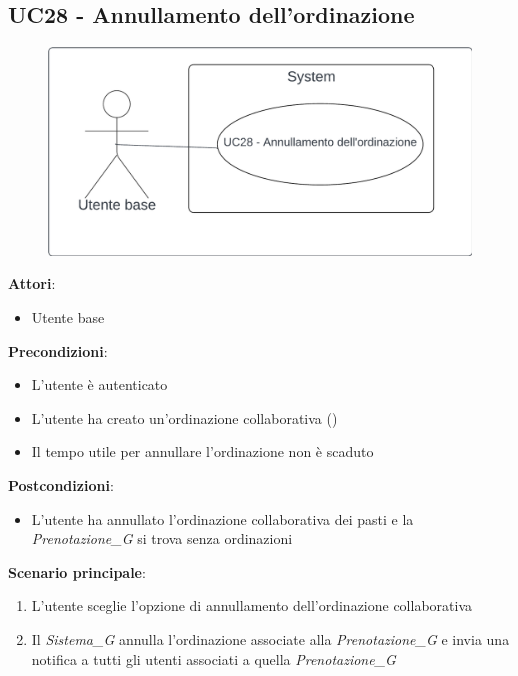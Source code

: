 \subsection{UC28 - Annullamento dell'ordinazione}\label{usecase:28}
\begin{figure}[H]
    \centering
    \includegraphics[width=0.9\linewidth]{ucd/UCD28.png}
\end{figure}
\textbf{Attori}:
\begin{itemize}
    \item Utente base
\end{itemize}
\textbf{Precondizioni}:
\begin{itemize}
    \item L'utente è autenticato
    \item L'utente ha creato un'ordinazione collaborativa ()
    \item Il tempo utile per annullare l'ordinazione non è scaduto
\end{itemize}
\textbf{Postcondizioni}:
\begin{itemize}
    \item L'utente ha annullato l'ordinazione collaborativa dei pasti e la \textit{Prenotazione_G} si trova senza ordinazioni
\end{itemize}
\textbf{Scenario principale}:
\begin{enumerate}
    \item L'utente sceglie l'opzione di annullamento dell'ordinazione collaborativa
    \item Il \textit{Sistema_G} annulla l'ordinazione associate alla \textit{Prenotazione_G} e invia una notifica a tutti gli utenti associati a quella \textit{Prenotazione_G}
\end{enumerate}
\newpage